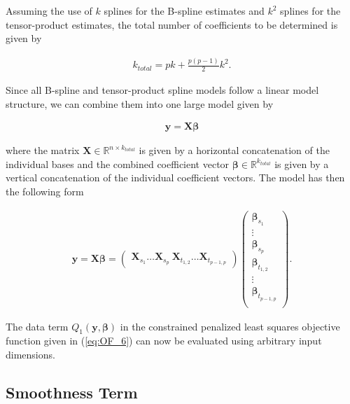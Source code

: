 \documentclass[10pt,a4paper]{article}
\begin{document}
	
	Assuming the use of $k$ splines for the B-spline estimates and $k^2$ splines for the tensor-product estimates, the total number of coefficients to be determined is given by 
	
	\begin{align}\label{eq:tps_total_number_of_coef}
		k_{total} = pk + \frac{p(p-1)}{2}k^2. 
	\end{align}
	
	Since all B-spline and tensor-product spline models follow a linear model structure, we can combine them into one large model given by
	
	\begin{align}\label{eq:tps_lin_mod}
		\boldsymbol{y} = \boldsymbol{X} \boldsymbol{\beta}
	\end{align}
		
	where the matrix $\boldsymbol{X} \in \mathbb{R}^{n \times k_{total}}$ is given by a horizontal concatenation of the individual bases and the combined coefficient vector $\boldsymbol{\beta} \in \mathbb{R}^{k_{total}}$ is given by a vertical concatenation of the individual coefficient vectors. The model has then the following form
		
	\begin{align}\label{eq:tps_lin_model_verbose}
		\boldsymbol{y} = \boldsymbol{X} \boldsymbol{\beta} = 
					\begin{pmatrix} \boldsymbol{X}_{s_1} \dots \boldsymbol{X}_{s_p} \ \boldsymbol{X}_{t_{1,2}} \dots \boldsymbol{X}_{t_{p-1,p}} \end{pmatrix} 
					\begin{pmatrix} \boldsymbol{\beta}_{s_1} \\ 
									\vdots  \\ 
									\boldsymbol{\beta}_{s_p} \\ 
									\boldsymbol{\beta}_{t_{1,2}} \\ 
									\vdots \\ 
									\boldsymbol{\beta}_{t_{p-1,p}} \\
					\end{pmatrix}.
	\end{align}
	
	The data term $Q_1(\boldsymbol{y}, \boldsymbol{\beta})$ in the constrained penalized least squares objective function given in (\ref{eq:OF_6}) can now be evaluated using arbitrary input dimensions. 

	\subsection{Smoothness Term}
	
\end{document}
